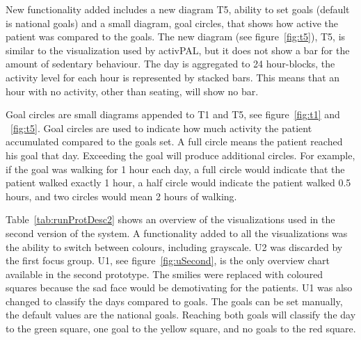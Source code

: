 New functionality added includes a new diagram T5, ability to set goals (default is national goals) and a small diagram, goal circles, that shows how active the patient was compared to the goals. The new diagram (see figure~\ref{fig:t5}), T5, is similar to the visualization used by activPAL, but it does not show a bar for the amount of sedentary behaviour. The day is aggregated to 24 hour-blocks, the activity level for each hour is represented by stacked bars. This means that an hour with no activity, other than seating, will show no bar. 

Goal circles are small diagrams appended to T1 and T5, see figure~\ref{fig:t1} and ~\ref{fig:t5}. Goal circles are used to indicate how much activity the patient accumulated compared to the goals set. A full circle means the patient reached his goal that day. Exceeding the goal will produce additional circles. For example, if the goal was walking for 1 hour each day, a full circle would indicate that the patient walked exactly 1 hour, a half circle would indicate the patient walked 0.5 hours, and two circles would mean 2 hours of walking.

Table~\ref{tab:runProtDesc2} shows an overview of the visualizations used in the second version of the system. A functionality added to all the visualizations was the ability to switch between colours, including grayscale. U2 was discarded by the first focus group. U1, see figure~\ref{fig:uSecond}, is the only overview chart available in the second prototype. The smilies were replaced with coloured squares because the sad face would be demotivating for the patients. U1 was also changed to classify the days compared to goals. The goals can be set manually, the default values are the national goals. Reaching both goals will classify the day to the green square, one goal to the yellow square, and no goals to the red square.

